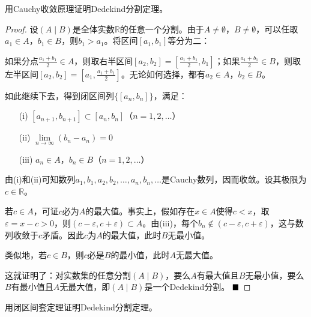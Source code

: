 \begin{problem}
    用Cauchy收敛原理证明Dedekind分割定理。
\end{problem}


    \begin{proof}
        设$(A \mid B)$是全体实数$\mathbb{R}$的任意一个分割。由于$A \neq \emptyset$，$B \neq \emptyset$，可以任取$a_1 \in A$，$b_1 \in B$，则$b_1 > a_1$。将区间$[a_1, b_1]$等分为二：
        
        如果分点$\frac{a_1 + b_1}{2} \in A$，则取右半区间$[a_2, b_2] = \left[\frac{a_1 + b_1}{2}, b_1\right]$；如果$\frac{a_1 + b_1}{2} \in B$，则取左半区间$[a_2, b_2] = \left[a_1, \frac{a_1 + b_1}{2}\right]$。无论如何选择，都有$a_2 \in A$，$b_2 \in B$。
        
        如此继续下去，得到闭区间列$\{[a_n, b_n]\}$，满足：
        \begin{itemize}
        \item[(i)] $[a_{n+1}, b_{n+1}] \subset [a_n, b_n]$（$n=1,2,\dots$）
        \item[(ii)] $\lim\limits_{n \to \infty}(b_n - a_n) = 0$
        \item[(iii)] $a_n \in A$，$b_n \in B$（$n=1,2,\dots$）
        \end{itemize}
        
        由(i)和(ii)可知数列$a_1, b_1, a_2, b_2, \dots, a_n, b_n, \dots$是Cauchy数列，因而收敛。设其极限为$c \in \mathbb{R}$。
        
        若$c \in A$，可证$c$必为$A$的最大值。事实上，假如存在$x \in A$使得$c < x$，取$\varepsilon = x - c > 0$，则$(c - \varepsilon, c + \varepsilon) \subset A$。由(iii)，每个$b_n \notin (c - \varepsilon, c + \varepsilon)$，这与数列收敛于$c$矛盾。因此$c$为$A$的最大值，此时$B$无最小值。
        
        类似地，若$c \in B$，则$c$必是$B$的最小值，此时$A$无最大值。
        
        这就证明了：对实数集的任意分割$(A \mid B)$，要么$A$有最大值且$B$无最小值，要么$B$有最小值且$A$无最大值，即$(A \mid B)$是一个Dedekind分割。  $\hfill \blacksquare$
    \end{proof}

    \begin{problem}
        用闭区间套定理证明Dedekind分割定理。
    \end{problem}

